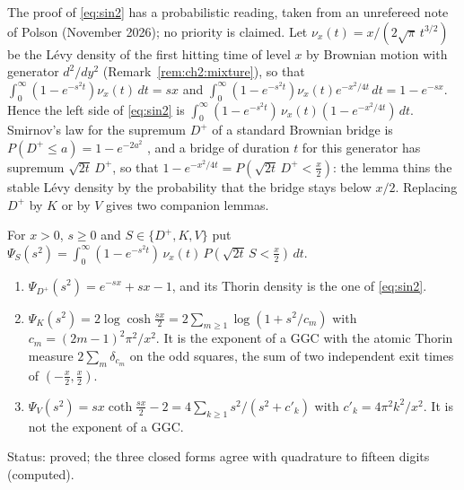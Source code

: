 The proof of \eqref{eq:sin2} has a probabilistic reading, taken from an unrefereed note of Polson (November 2026); no priority is claimed. Let $\nu_x(t)=x/(2\sqrt\pi\,t^{3/2})$ be the L\'evy density of the first hitting time of level $x$ by Brownian motion with generator $d^2/dy^2$ (Remark~\ref{rem:ch2:mixture}), so that $\int_0^\infty(1-e^{-s^2t})\nu_x(t)\,dt=sx$ and $\int_0^\infty(1-e^{-s^2t})\nu_x(t)e^{-x^2/4t}\,dt=1-e^{-sx}$. Hence the left side of \eqref{eq:sin2} is $\int_0^\infty(1-e^{-s^2t})\,\nu_x(t)(1-e^{-x^2/4t})\,dt$. Smirnov's law for the supremum $D^+$ of a standard Brownian bridge is $P(D^+\le a)=1-e^{-2a^2}$ \cite{Smirnov39}, and a bridge of duration $t$ for this generator has supremum $\sqrt{2t}\,D^+$, so that $1-e^{-x^2/4t}=P(\sqrt{2t}\,D^+<\frac x2)$: the lemma thins the stable L\'evy density by the probability that the bridge stays below $x/2$. Replacing $D^+$ by $K$ or by $V$ gives two companion lemmas.

\begin{proposition}\label{prop:ch2:thin}
For $x>0$, $s\ge0$ and $S\in\{D^+,K,V\}$ put $\Psi_S(s^2)=\int_0^\infty(1-e^{-s^2t})\,\nu_x(t)\,P(\sqrt{2t}\,S<\frac x2)\,dt$.
\begin{enumerate}
\item $\Psi_{D^+}(s^2)=e^{-sx}+sx-1$, and its Thorin density is the one of \eqref{eq:sin2}.
\item $\Psi_K(s^2)=2\log\cosh\frac{sx}2=2\sum_{m\ge1}\log(1+s^2/c_m)$ with $c_m=(2m-1)^2\pi^2/x^2$. It is the exponent of a GGC with the atomic Thorin measure $2\sum_m\delta_{c_m}$ on the odd squares, the sum of two independent exit times of $(-\frac x2,\frac x2)$.
\item $\Psi_V(s^2)=sx\coth\frac{sx}2-2=4\sum_{k\ge1}s^2/(s^2+c'_k)$ with $c'_k=4\pi^2k^2/x^2$. It is not the exponent of a GGC.
\end{enumerate}
Status: proved; the three closed forms agree with quadrature to fifteen digits (computed).
\end{proposition}

